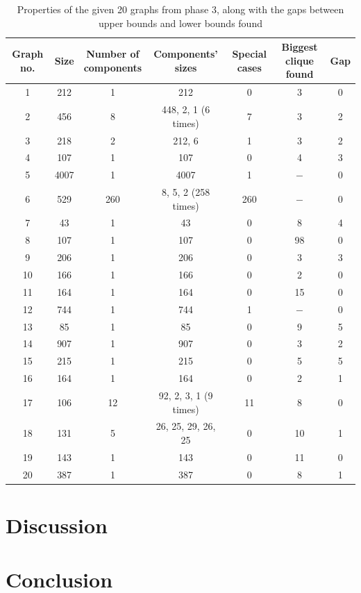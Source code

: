 \documentclass[a4paper]{report}
\begin{document}
	\begin{table} [h!]
		\begin{center}
			\begin{tabular}{| c | c | c | c |c|c|c|}
				\hline
				Graph no. & Size & \shortstack{Number of \\ components}& Components' sizes & Special cases&\shortstack{Biggest clique\\ found}& Gap \\
				\hline
				1 & 212 & 1 & 212 &0&3& 0\\
				\hline
				2 & 456 & 8 & 448, 2, 1 (6 times) &7&3& 2\\
				\hline
				3 & 218 & 2 & 212, 6 &1&3& 2\\
				\hline
				4 & 107 & 1 & 107 &0&4& 3\\
				\hline
				5 & 4007 & 1 & 4007 &1&$-$& 0\\
				\hline
				6 & 529 & 260 & 8, 5, 2 (258 times) &260&$-$& 0\\
				\hline
				7 & 43 & 1 & 43 &0&8& 4\\
				\hline
				8 & 107 & 1 & 107 &0&98& 0\\
				\hline
				9 & 206 & 1 & 206 &0&3& 3\\
				\hline
				10 & 166 & 1 & 166 &0&2& 0\\
				\hline
				11 & 164 & 1 & 164 &0&15& 0\\
				\hline
				12 & 744 & 1 & 744 &1&$-$& 0\\
				\hline
				13 & 85 & 1 & 85 &0&9& 5\\
				\hline
				14 & 907 & 1 & 907 &0&3& 2\\
				\hline
				15 & 215 & 1 & 215 &0&5& 5\\
				\hline
				16 & 164 & 1 & 164 &0&2& 1\\
				\hline
				17 & 106 & 12 & 92, 2, 3, 1 (9 times) &11&8& 0\\
				\hline
				18 & 131 & 5 & 26, 25, 29, 26, 25 &0&10& 1\\
				\hline
				19 & 143 & 1 & 143 &0&11& 0\\
				\hline
				20 & 387 & 1 & 387 &0&8& 1\\
				\hline
			\end{tabular}
		\end{center}
		\caption{Properties of the given 20 graphs from phase 3, along with the gaps between upper bounds and lower bounds found}
		\label{tab:prop}
	\end{table}
	\chapter{Discussion}
	
	
	\chapter{Conclusion}
	
	
	
	
	
\end{document}
